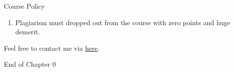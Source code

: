 \documentclass{beamer}
\begin{document}
\begin{frame}{Course Policy}
\begin{enumerate}
\item Plagiarism must dropped out from the course with zero points and huge demerit. \\
\end{enumerate}
\end{frame}
\begin{frame}{}
\begin{center}
\Large{Feel free to contact me via \href{mailto:politics.tchsiao@gmail.com}{here}.}
\end{center}
\end{frame}
\begin{frame}{}
\begin{center}
\Large{End of Chapter 0}
\end{center}
\end{frame}
\end{document}
